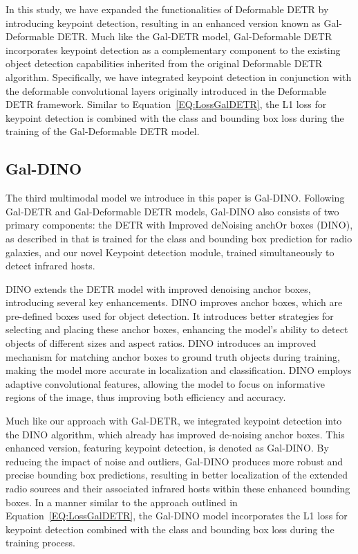 \documentclass[
  journal=pasa,
  manuscript=research-paper, %
  year=2020,
  volume=37,
]{cup-journal}
\begin{document}
In this study, we have expanded the functionalities of Deformable DETR by introducing keypoint detection, resulting in an enhanced version known as Gal-Deformable DETR. 
Much like the Gal-DETR model, Gal-Deformable DETR incorporates keypoint detection as a complementary component to the existing object detection capabilities inherited from the original Deformable DETR algorithm. 
Specifically, we have integrated keypoint detection in conjunction with the deformable convolutional layers originally introduced in the Deformable DETR framework. 
Similar to Equation~\ref{EQ:LossGalDETR}, the L1 loss for keypoint detection is combined with the class and bounding box loss during the training of the Gal-Deformable DETR model.

\subsection{Gal-DINO}
\label{SEC:GalDINO}
The third multimodal model we introduce in this paper is Gal-DINO. Following Gal-DETR and Gal-Deformable DETR models, Gal-DINO also consists of two primary components: the DETR with Improved deNoising anchOr boxes (DINO), as described in \citet[][]{zhang2022dino} that is trained for the class and bounding box prediction for radio galaxies, and our novel Keypoint detection module, trained simultaneously to detect infrared hosts.

DINO extends the DETR model with improved denoising anchor boxes, introducing several key enhancements.
DINO improves anchor boxes, which are pre-defined boxes used for object detection. It introduces better strategies for selecting and placing these anchor boxes, enhancing the model's ability to detect objects of different sizes and aspect ratios.
DINO introduces an improved mechanism for matching anchor boxes to ground truth objects during training, making the model more accurate in localization and classification.
DINO employs adaptive convolutional features, allowing the model to focus on informative regions of the image, thus improving both efficiency and accuracy.

Much like our approach with Gal-DETR, we integrated keypoint detection into the DINO algorithm, which already has improved de-noising anchor boxes. 
This enhanced version, featuring keypoint detection, is denoted as Gal-DINO. 
By reducing the impact of noise and outliers, Gal-DINO produces more robust and precise bounding box predictions, resulting in better localization of the extended radio sources and their associated infrared hosts within these enhanced bounding boxes.
In a manner similar to the approach outlined in Equation~\ref{EQ:LossGalDETR}, the Gal-DINO model incorporates the L1 loss for keypoint detection combined with the class and bounding box loss during the training process.
\end{document}
